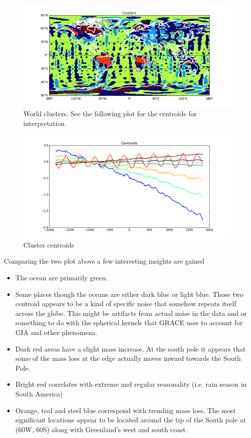 \begin{figure}[H]
	\center
	\includegraphics[width=\textwidth]{figures/world_clusters.png}
	\caption{World clusters. See the following plot for the centroids for interpretation}
	\label{fig:world_clusters}
\end{figure}
\begin{figure}[H]
	\center
	\includegraphics[width=\textwidth]{figures/cluster_centroids.png}
	\caption{Cluster centroids}
	\label{fig:cluster_centroids}
\end{figure}

Comparing the two plot above a few interesting insights are gained
\begin{itemize}
 \item The ocean are primarily green.
\item Some places though the oceans are either dark blue or light blue. Those two centroid appears to be a kind of specific noise that somehow repeats itself across the globe. This might be artifacts from actual noise in the data and or something to do with the spherical kernels that GRACE uses to account for GIA and other phenomena.
\item Dark red areas have a slight mass increase. At the south pole it appears that some of the mass loss at the edge actually moves inward towards the South Pole.
\item  Bright red correlates with extreme and regular seasonality (i.e. rain season in South America)
\item Orange, teal and steel blue correspond with trending mass loss. The most significant locations appear to be located around the tip of the South pole at (60W, 60S) along with Greenland's west and south coast.
\end{itemize}

